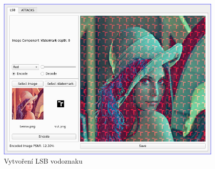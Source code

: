 \begin{figure}[h!]
    \begin{center}
        \includegraphics[scale=0.4]{images/encoding.jpg}
        \caption{Vytvoření LSB vodoznaku}
    \end{center}
\end{figure}

